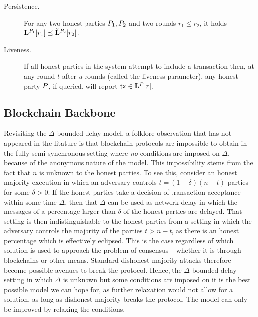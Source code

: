 \begin{definition}[Ledger]
\end{definition}

\begin{description}
  \item[Persistence.]
    For any two honest parties $P_1,P_2$ and two rounds $r_1\leq r_2$,
    it holds  $\mathbf{L}^{P_1}[r_1] \preceq
    \check{\mathbf{L}}^{P_2}[r_2]$.

  \item[Liveness.]
    If all honest parties in the system attempt to include a  transaction
    then, at any round $t$ after $u$ rounds (called the
    liveness parameter), any honest party $P$, if queried,
    will report $\mathsf{tx} \in \mathbf{L}^{P}[r]$.
\end{description}


\subsection{Blockchain Backbone}

\begin{remark}
Revisiting the $\Delta$-bounded delay model, a folklore observation that has not appeared in
the litature is that blockchain protocols are impossible to obtain in the fully
semi-synchronous setting where \emph{no} conditions are imposed on $\Delta$,
because of the anonymous nature of the model. This impossibility stems from the
fact that $n$ is unknown to the honest parties. To see this, consider an
honest majority execution in which an adversary controls $t = (1 - \delta)(n -
t)$ parties for some $\delta > 0$. If the honest parties take a decision of
transaction acceptance within some time $\Delta$, then that $\Delta$ can be used
as network delay in which the messages of a percentage larger than $\delta$ of
the honest parties are delayed. That setting is then indistinguishable to the
honest parties from a setting in which the adversary controls the majority of
the parties $t > n - t$, as there is an honest percentage which is effectively
eclipsed. This is the case regardless of which solution is used to approach the
problem of consensus -- whether it is through blockchains or other means.
Standard dishonest majority attacks therefore become possible avenues to break
the protocol. Hence, the $\Delta$-bounded delay setting in which $\Delta$ is
unknown but some conditions are imposed on it is the best possible model we can
hope for, as further relaxation would not allow for a solution, as long as
dishonest majority breaks the protocol. The model can only be improved by
relaxing the conditions.
\end{remark}

